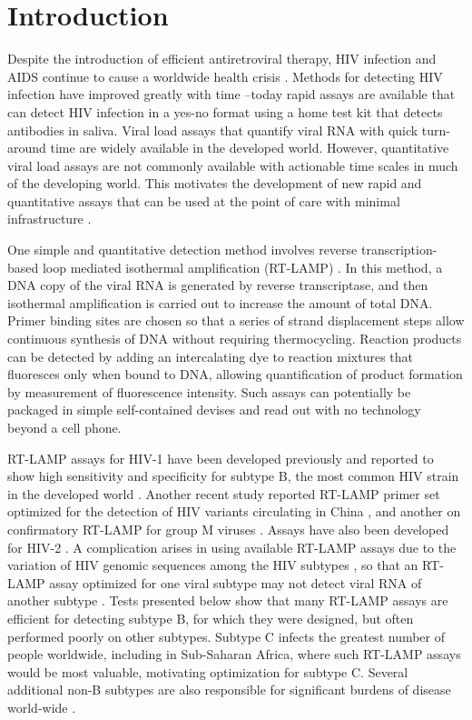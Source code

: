 \documentclass[../sherrill-Mix_thesis.tex]{subfiles}
\begin{document}
\section{Introduction}
	Despite the introduction of efficient antiretroviral therapy, HIV infection and AIDS continue to cause a worldwide health crisis \citep{Murray2014}. Methods for detecting HIV infection have improved greatly with time \citep{Sollis2014}--today rapid assays are available that can detect HIV infection in a yes-no format using a home test kit that detects antibodies in saliva. Viral load assays that quantify viral RNA with quick turn-around time are widely available in the developed world. However, quantitative viral load assays are not commonly available with actionable time scales in much of the developing world. This motivates the development of new rapid and quantitative assays that can be used at the point of care with minimal infrastructure \citep{Liu2013,Curtis2012}.

	One simple and quantitative detection method involves reverse transcription-based loop mediated isothermal amplification (RT-LAMP) \citep{Notomi2000}. In this method, a DNA copy of the viral RNA is generated by reverse transcriptase, and then isothermal amplification is carried out to increase the amount of total DNA. Primer binding sites are chosen so that a series of strand displacement steps allow continuous synthesis of DNA without requiring thermocycling. Reaction products can be detected by adding an intercalating dye to reaction mixtures that fluoresces only when bound to DNA, allowing quantification of product formation by measurement of fluorescence intensity. Such assays can potentially be packaged in simple self-contained devises and read out with no technology beyond a cell phone.

	RT-LAMP assays for HIV-1 have been developed previously and reported to show high sensitivity and specificity for subtype B, the most common HIV strain in the developed world \citep{Curtis2012,Curtis2008,Curtis2009}. Another recent study reported RT-LAMP primer set optimized for the detection of HIV variants circulating in China \citep{Zeng2014}, and another on confirmatory RT-LAMP for group M viruses \citep{Hosaka2009}. Assays have also been developed for HIV-2 \citep{Curtis2014}. A complication arises in using available RT-LAMP assays due to the variation of HIV genomic sequences among the HIV subtypes \citep{Kuiken2013,Manak2012}, so that an RT-LAMP assay optimized for one viral subtype may not detect viral RNA of another subtype \citep{Louwagie1993}. Tests presented below show that many RT-LAMP assays are efficient for detecting subtype B, for which they were designed, but often performed poorly on other subtypes. Subtype C infects the greatest number of people worldwide, including in Sub-Saharan Africa, where such RT-LAMP assays would be most valuable, motivating optimization for subtype C. Several additional non-B subtypes are also responsible for significant burdens of disease world-wide \citep{Buonaguro2007}.
\end{document}
